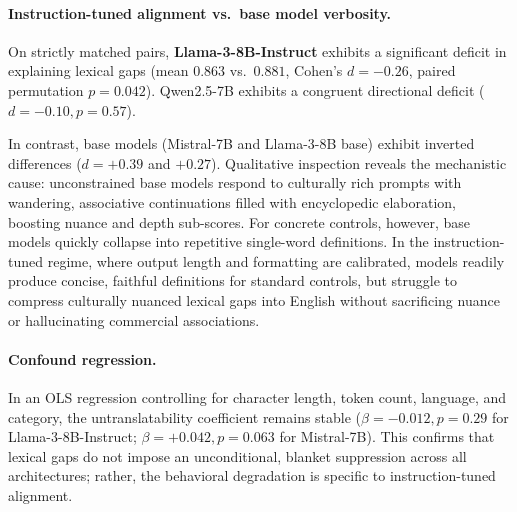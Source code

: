 \documentclass{article}
\begin{document}
\paragraph{Instruction-tuned alignment vs.\ base model verbosity.}
On strictly matched pairs, \textbf{Llama-3-8B-Instruct} exhibits a significant deficit in explaining lexical gaps (mean $0.863$ vs.\ $0.881$, Cohen's $d = -0.26$, paired permutation $p = 0.042$). Qwen2.5-7B exhibits a congruent directional deficit ($d = -0.10, p = 0.57$). 

In contrast, base models (Mistral-7B and Llama-3-8B base) exhibit inverted differences ($d = +0.39$ and $+0.27$). Qualitative inspection reveals the mechanistic cause: unconstrained base models respond to culturally rich prompts with wandering, associative continuations filled with encyclopedic elaboration, boosting nuance and depth sub-scores. For concrete controls, however, base models quickly collapse into repetitive single-word definitions. 
In the instruction-tuned regime, where output length and formatting are calibrated, models readily produce concise, faithful definitions for standard controls, but struggle to compress culturally nuanced lexical gaps into English without sacrificing nuance or hallucinating commercial associations.

\paragraph{Confound regression.}
In an OLS regression controlling for character length, token count, language, and category, the untranslatability coefficient remains stable ($\beta = -0.012, p = 0.29$ for Llama-3-8B-Instruct; $\beta = +0.042, p = 0.063$ for Mistral-7B). This confirms that lexical gaps do not impose an unconditional, blanket suppression across all architectures; rather, the behavioral degradation is specific to instruction-tuned alignment.
\end{document}
